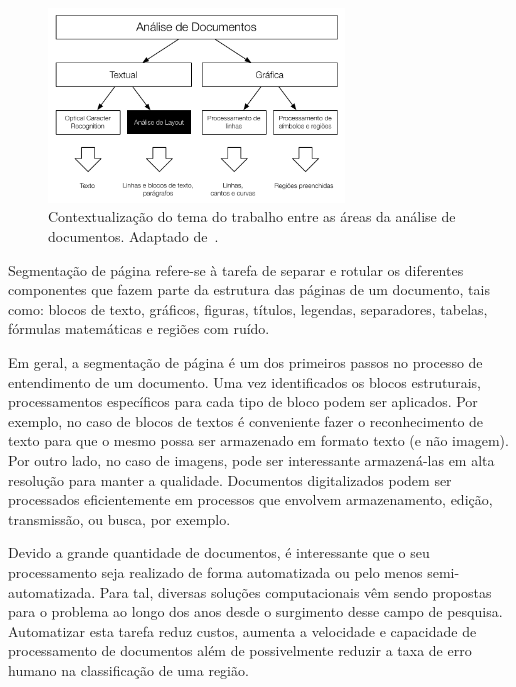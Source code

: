 \documentclass[a4paper,11pt]{article}
\begin{document}
\begin{figure}[htb]
\begin{center}
\includegraphics[width=0.7\textwidth]{assets/document_processing_areas_hierarquies.pdf}
\end{center}
\caption{Contextualização do tema do trabalho entre as áreas da
  análise de documentos. Adaptado de~\cite{Kasturi_OGorman_Govindaraju_2002}.}
\label{fig:context1}
\end{figure}

Segmentação de página refere-se à tarefa de separar e rotular os diferentes
componentes que fazem parte da estrutura das páginas de um
documento, tais como: blocos de texto, gráficos, figuras, títulos,
legendas, separadores, tabelas, fórmulas matemáticas e regiões com
ruído.

Em geral, a segmentação de página é um dos primeiros passos no
processo de entendimento de um documento. Uma vez identificados os
blocos estruturais, processamentos específicos para cada tipo de bloco
podem ser aplicados. Por exemplo, no caso de blocos de textos é
conveniente fazer o reconhecimento de texto para que o mesmo possa ser
armazenado em formato texto (e não imagem). Por outro lado, no caso de
imagens, pode ser interessante armazená-las em alta resolução para
manter a qualidade. Documentos digitalizados podem ser processados
eficientemente em processos que envolvem armazenamento, edição,
transmissão, ou busca, por exemplo.

Devido a grande quantidade de documentos, é interessante que o seu
processamento seja realizado de forma automatizada ou pelo menos
semi-automatizada. Para tal, diversas soluções computacionais vêm
sendo propostas para o problema ao longo dos anos desde o surgimento
desse campo de pesquisa. Automatizar esta tarefa reduz custos, aumenta
a velocidade e capacidade de processamento de documentos além de
possivelmente reduzir a taxa de erro humano na classificação de uma
região.
\end{document}

